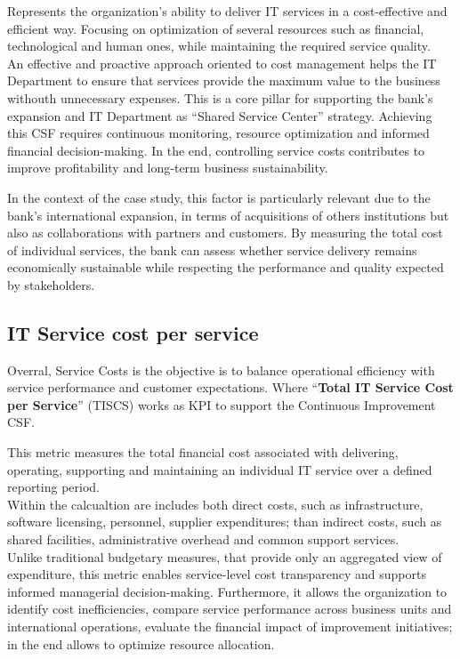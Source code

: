 Represents the organization's ability to deliver IT services in a cost-effective and efficient way. Focusing on optimization of several resources such as financial, technological and human ones, while maintaining the required service quality. \\
An effective and proactive approach oriented to cost management helps the IT Department to ensure that services provide the maximum value to the business withouth unnecessary expenses. This is a core pillar for supporting the bank's expansion and IT Department as ``Shared Service Center'' strategy.
Achieving this CSF requires continuous monitoring, resource optimization and informed financial decision-making. In the end, controlling service costs contributes to improve profitability and long-term business sustainability.



In the context of the case study, this factor is particularly relevant due to the bank's international expansion, in terms of acquisitions of others institutions but also as collaborations with partners and customers. By measuring the total cost of individual services, the bank can assess whether service delivery remains economically sustainable while respecting the performance and quality expected by stakeholders.



\subsection{IT Service cost per service}
\label{sub:itservicecost}

Overral, Service Costs is the objective is to balance operational efficiency with service performance and customer expectations. Where ``\textbf{Total IT Service Cost per Service}'' (TISCS) works as KPI to support the Continuous Improvement CSF.

This metric measures the total financial cost associated with delivering, operating, supporting and maintaining an individual IT service over a defined reporting period. \\
Within the calcualtion are includes both direct costs, such as infrastructure, software licensing, personnel, supplier expenditures; than indirect costs, such as shared facilities, administrative overhead and common support services. \\

Unlike traditional budgetary measures, that provide only an aggregated view of expenditure, this metric enables service-level cost transparency and supports informed managerial decision-making.
Furthermore, it allows the organization to identify cost inefficiencies, compare service performance across business units and international operations, evaluate the financial impact of improvement initiatives; in the end allows to optimize resource allocation. \\


